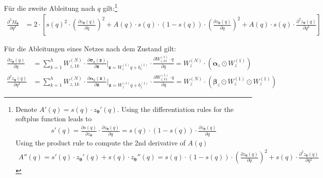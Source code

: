 \documentclass[a4paper, 12pt]{scrartcl}
\begin{document}
Für die zweite Ableitung nach $q$ gilt:\footnote{
    Denote $A'(q) = s(q) \cdot z_{\bm{\theta}}'(q)$. Using the differentiation 
    rules for the softplus function leads to
    \begin{align*}
        s'(q) 
        =
        \frac{\partial s(q)}{\partial z_{\bm{\theta}}} 
        \cdot 
        \frac{\partial z_{\bm{\theta}}(q)}{\partial q}
        =
        s(q) \cdot (1-s(q)) \cdot \frac{\partial z_{\bm{\theta}}(q)}{\partial q} 
    \end{align*}
    Using the product rule to compute the 2nd derivative of $A(q)$
    \begin{align*}
        A''(q) 
        =
        s'(q) \cdot z_{\bm{\theta}}'(q) + s(q) \cdot z_{\bm{\theta}}''(q)
        =
        s(q) \cdot (1-s(q)) \cdot 
        \left(
            \frac{\partial z_{\bm{\theta}}(q)}{\partial q} 
        \right)^2
        +
        s(q) 
        \cdot 
        \frac{\partial^2 z_{\bm{\theta}}(q)}{\partial q^2}
    \end{align*}
}
\begin{align*}
    \frac{\partial^2 M_{\bm{\theta}}}{\partial q^2}
    &=
    2 \cdot 
    \left[
        s(q)^2 
        \cdot 
        \left(
            \frac{\partial z_{\bm{\theta}}(q)}{\partial q} 
        \right)^2
        + 
        A(q) \cdot s(q) \cdot (1-s(q)) \cdot 
        \left(
            \frac{\partial z_{\bm{\theta}}(q)}{\partial q} 
        \right)^2
        +
        A(q) \cdot s(q) 
        \cdot 
        \frac{\partial^2 z_{\bm{\theta}}(q)}{\partial q^2}
    \right]
\end{align*}

Für die Ableitungen eines Netzes nach dem Zustand gilt:
\begin{align*}
    \frac{\partial z_{\bm{\theta}}(q)}{\partial q}
    &=
    \sum_{k=1}^{h}
    W_{z,1k}^{(N)} 
    \cdot 
    \frac{\partial \bm{\sigma}_k (\bm{z})}{\partial \bm{z}} \bigg|_{\bm{z} = W_z^{(1)}q + b^{(1)}_z}
    \cdot
    \frac{\partial W_{z,k1}^{(1)} \cdot q}{\partial q}
    =
    W_z^{(N)} \cdot \left(\bm{\alpha}_z \odot W_z^{(1)}\right)
    \\
    \frac{\partial^2 z_{\bm{\theta}}(q)}{\partial q^2}
    &=
    \sum_{k=1}^{h}
    W_{z,1k}^{(N)} 
    \cdot 
    \frac{\partial \bm{\alpha}_k (\bm{z})}{\partial \bm{z}} \bigg|_{\bm{z} = W_z^{(1)}q + b^{(1)}_z}
    \cdot
    \frac{\partial W_{z,k1}^{(1)} \cdot q}{\partial q}
    =
    W_z^{(N)} \cdot \left(\bm{\beta}_z \odot W_z^{(1)} \odot W_z^{(1)}\right)
\end{align*}
\end{document}
